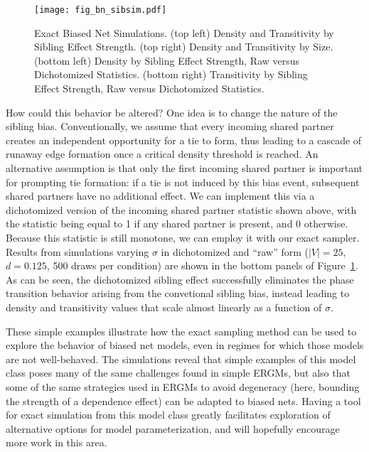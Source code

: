 \documentclass[11pt]{article}
\begin{document}
\begin{figure}
\begin{center}
\texttt{[image: fig\_bn\_sibsim.pdf]}
\caption{\label{f_sibsim} Exact Biased Net Simulations.  (top left) Density and Transitivity by Sibling Effect Strength.  (top right)  Density and Transitivity by Size.  (bottom left) Density by Sibling Effect Strength, Raw versus Dichotomized Statistics. (bottom right) Transitivity by Sibling Effect Strength, Raw versus Dichotomized Statistics. }
\end{center}
\end{figure}

How could this behavior be altered?  One idea is to change the nature of the sibling bias.  Conventionally, we assume that every incoming shared partner creates an independent opportunity for a tie to form, thus leading to a cascade of runaway edge formation once a critical density threshold is reached.  An alternative assumption is that only the first incoming shared partner is important for prompting tie formation: if a tie is not induced by this bias event, subsequent shared partners have no additional effect.  We can implement this via a dichotomized version of the incoming shared partner statistic shown above, with the statistic being equal to 1 if any shared partner is present, and 0 otherwise.  Because this statistic is still monotone, we can employ it with our exact sampler.  Results from simulations varying $\sigma$ in dichotomized and ``raw'' form ($|V|=25$, $d=0.125$, 500 draws per condition) are shown in the bottom panels of Figure~\ref{f_sibsim}.  As can be seen, the dichotomized sibling effect successfully eliminates the phase transition behavior arising from the convetional sibling bias, instead leading to density and transitivity values that scale almost linearly as a function of $\sigma$.  

These simple examples illustrate how the exact sampling method can be used to explore the behavior of biased net models, even in regimes for which those models are not well-behaved.  The simulations reveal that simple examples of this model class poses many of the same challenges found in simple ERGMs, but also that some of the same strategies used in ERGMs to avoid degeneracy (here, bounding the strength of a dependence effect) can be adapted to biased nets.  Having a tool for exact simulation from this model class greatly facilitates exploration of alternative options for model parameterization, and will hopefully encourage more work in this area.
\end{document}

